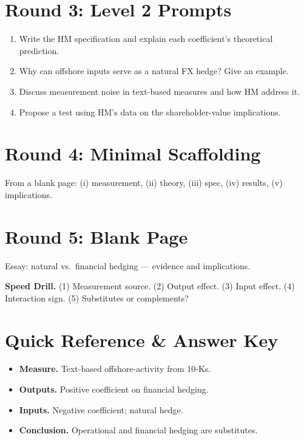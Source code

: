 \documentclass[11pt]{article}
\begin{document}
\section*{Round 3: Level 2 Prompts}
\begin{enumerate}
\item Write the HM specification and explain each coefficient's theoretical prediction.
\item Why can offshore inputs serve as a natural FX hedge? Give an example.
\item Discuss measurement noise in text-based measures and how HM address it.
\item Propose a test using HM's data on the shareholder-value implications.
\end{enumerate}

\section*{Round 4: Minimal Scaffolding}
From a blank page: (i) measurement, (ii) theory, (iii) spec, (iv) results, (v) implications.

\section*{Round 5: Blank Page}
Essay: natural vs.\ financial hedging --- evidence and implications.

\vspace{6pt}
\begin{drillbox}
\textbf{Speed Drill.} (1) Measurement source. (2) Output effect. (3) Input effect. (4) Interaction sign. (5) Substitutes or complements?
\end{drillbox}

\section*{Quick Reference \& Answer Key}
\begin{answerbox}
\begin{itemize}
\item \textbf{Measure.} Text-based offshore-activity from 10-Ks.
\item \textbf{Outputs.} Positive coefficient on financial hedging.
\item \textbf{Inputs.} Negative coefficient; natural hedge.
\item \textbf{Conclusion.} Operational and financial hedging are substitutes.
\end{itemize}
\end{answerbox}
\end{document}
